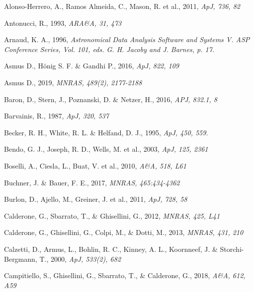 \documentclass[]{aa}
\begin{document}
\begin{thebibliography}{}

Alonso-Herrero, A., Ramos Almeida, C., Mason, R. et al., 2011,
\newblock \emph{ApJ, 736, 82}

Antonucci, R., 1993,
\newblock \emph{ARA\&A, 31, 473}

Arnaud, K. A., 1996,
\newblock \emph{Astronomical Data Analysis Software and Systems V. ASP Conference Series, Vol. 101, eds. G. H. Jacoby and J. Barnes, p. 17.}

Asmus D., H\"{o}nig S. F. \& Gandhi P., 2016,
\newblock \emph{ApJ, 822, 109}

Asmus D., 2019,
\newblock \emph{MNRAS, 489(2), 2177-2188}

Baron, D., Stern, J., Poznanski, D. \& Netzer, H., 2016,
\newblock \emph{APJ, 832.1, 8}

Barvainis, R., 1987,
\newblock \emph{ApJ, 320, 537}

Becker, R. H., White, R. L. \& Helfand, D. J., 1995, 
\newblock \emph{ApJ, 450, 559}.

Bendo, G. J., Joseph, R. D., Wells, M. et al., 2003,
\newblock \emph{ApJ, 125, 2361}

Boselli, A., Ciesla, L., Buat, V. et al., 2010,
\newblock \emph{A\&A, 518, L61}

Buchner, J. \& Bauer, F. E., 2017,
\newblock \emph{MNRAS, 465:434-4362}

Burlon, D., Ajello, M., Greiner, J. et al., 2011,
\newblock \emph{ApJ, 728, 58}

Calderone, G., Sbarrato, T., \& Ghisellini, G., 2012,
\newblock \emph{MNRAS, 425, L41}

Calderone, G., Ghisellini, G., Colpi, M., \& Dotti, M., 2013,
\newblock \emph{MNRAS, 431, 210}

Calzetti, D., Armus, L., Bohlin, R. C., Kinney, A. L., Koornneef, J. \& Storchi-Bergmann, T., 2000,
\newblock \emph{ApJ, 533(2), 682}

Campitiello, S., Ghisellini, G., Sbarrato, T., \& Calderone, G., 2018,
\newblock \emph{A\&A, 612, A59}


\end{thebibliography}
\end{document}
